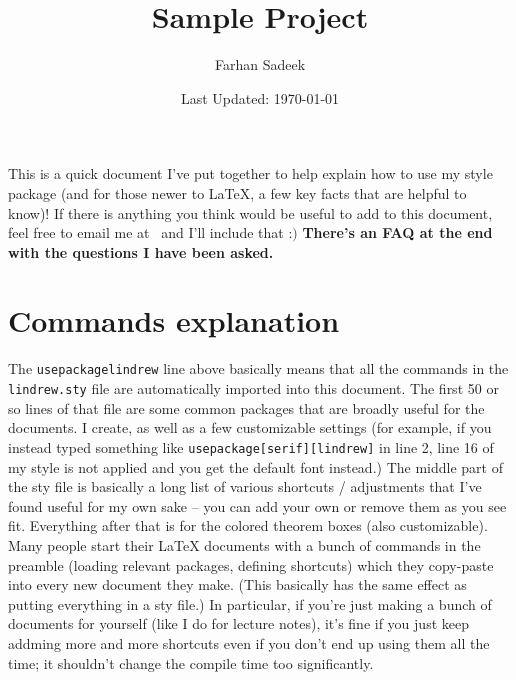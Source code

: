\documentclass[11pt]{article}
\title{Sample Project}
\author{Farhan Sadeek}
\date{Last Updated: \today}
\begin{document}
\maketitle
This is a quick document I've put together to help explain how to use my style
package (and for those newer to \LaTeX, a few key facts that are helpful to
know)! If there is anything you think would be useful to add to this document,
feel free to email me at \ and I'll include that :$)$
\textbf{There's an FAQ at the end with the questions I have been asked.}
\section{Commands explanation}
The \texttt{usepackagelindrew} line above basically means that all the
commands in the \texttt{lindrew.sty} file are automatically imported into this
document. The first 50 or so lines of that file are some common packages that
are broadly useful for the documents. I create, as well as a few customizable
settings (for example, if you instead typed something like
\texttt{usepackage[serif][lindrew]} in line 2, line 16 of my style is not
applied and you get the default font instead.) The middle part of the sty file
is basically a long list of various shortcuts / adjustments that I've found
useful for my own sake -- you can add your own or remove them as you see fit.
Everything after that is for the colored theorem boxes (also customizable).
\newline Many people start their LaTeX documents with a bunch of commands in
the preamble (loading relevant packages, defining shortcuts) which they
copy-paste into every new document they make. (This basically has the same
effect as putting everything in a sty file.) In particular, if you're just
making a bunch of documents for yourself (like I do for lecture notes), it's
fine if you just keep addming more and more shortcuts even if you don't end up
using them all the time; it shouldn't change the compile time too
significantly.
\end{document}
